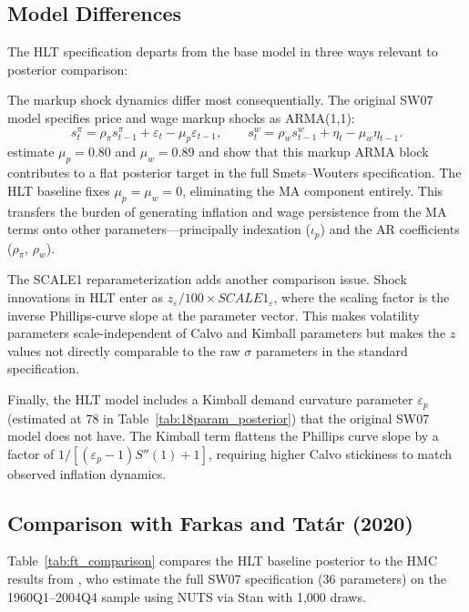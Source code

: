\documentclass[12pt]{article}
\theoremstyle{plain}
\theoremstyle{definition}
\theoremstyle{remark}
\begin{document}
\subsection{Model Differences}

The HLT specification departs from the base \citet{smets2007shocks} model in three ways relevant to posterior comparison:

The markup shock dynamics differ most consequentially. The original SW07 model specifies price and wage markup shocks as ARMA(1,1):
\[
s_t^{\pi} = \rho_\pi s_{t-1}^{\pi} + \varepsilon_t - \mu_p \varepsilon_{t-1}, \qquad
s_t^{w} = \rho_w s_{t-1}^{w} + \eta_t - \mu_w \eta_{t-1}.
\]
\citet{farkas2020bayesian} estimate $\mu_p = 0.80$ and $\mu_w = 0.89$ and show that this markup ARMA block contributes to a flat posterior target in the full Smets--Wouters specification. The HLT baseline fixes $\mu_p = \mu_w = 0$, eliminating the MA component entirely. This transfers the burden of generating inflation and wage persistence from the MA terms onto other parameters---principally indexation ($\iota_p$) and the AR coefficients ($\rho_\pi$, $\rho_w$).

The SCALE1 reparameterization adds another comparison issue. Shock innovations in HLT enter as $z_{\varepsilon}/100 \times \textit{SCALE1}_\varepsilon$, where the scaling factor is the inverse Phillips-curve slope at the parameter vector. This makes volatility parameters scale-independent of Calvo and Kimball parameters but makes the $z$ values not directly comparable to the raw $\sigma$ parameters in the standard specification.

Finally, the HLT model includes a Kimball demand curvature parameter $\varepsilon_p$ (estimated at 78 in Table~\ref{tab:18param_posterior}) that the original SW07 model does not have. The Kimball term flattens the Phillips curve slope by a factor of $1/[(\varepsilon_p - 1) S''(1) + 1]$, requiring higher Calvo stickiness to match observed inflation dynamics.

\subsection{Comparison with Farkas and Tat\'ar (2020)}

Table~\ref{tab:ft_comparison} compares the HLT baseline posterior to the HMC results from \citet{farkas2020bayesian}, who estimate the full SW07 specification (36 parameters) on the 1960Q1--2004Q4 sample using NUTS via Stan with 1,000 draws.
\end{document}
